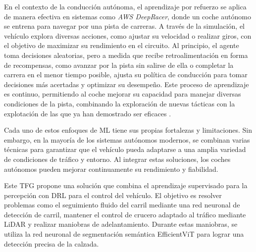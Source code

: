 En el contexto de la conducción autónoma, el aprendizaje por refuerzo se aplica de manera efectiva en sistemas como \textit{AWS DeepRacer}, donde un coche autónomo se entrena para navegar por una pista de carreras. A través de la simulación, el vehículo explora diversas acciones, como ajustar su velocidad o realizar giros, con el objetivo de maximizar su rendimiento en el circuito. Al principio, el agente toma decisiones aleatorias, pero a medida que recibe retroalimentación en forma de recompensas, como avanzar por la pista sin salirse de ella o completar la carrera en el menor tiempo posible, ajusta su política de conducción para tomar decisiones más acertadas y optimizar su desempeño. Este proceso de aprendizaje es continuo, permitiendo al coche mejorar su capacidad para manejar diversas condiciones de la pista, combinando la exploración de nuevas tácticas con la explotación de las que ya han demostrado ser eficaces \cite{ aws-deep-racer}.

Cada uno de estos enfoques de \ac{ML} tiene sus propias fortalezas y limitaciones. Sin embargo, en la mayoría de los sistemas autónomos modernos, se combinan varias técnicas para garantizar que el vehículo pueda adaptarse a una amplia variedad de condiciones de tráfico y entorno. Al integrar estas soluciones, los coches autónomos pueden mejorar continuamente su rendimiento y fiabilidad.

Este \ac{TFG} propone una solución que combina el aprendizaje supervisado para la percepción con \ac{DRL} para el control del vehículo. El objetivo es resolver problemas como el seguimiento fluido del carril mediante una red neuronal de detección de carril, mantener el control de crucero adaptado al tráfico mediante \ac{LiDAR} y realizar maniobras de adelantamiento. Durante estas maniobras, se utiliza la red neuronal de segmentación semántica EfficientViT para lograr una detección precisa de la calzada.

